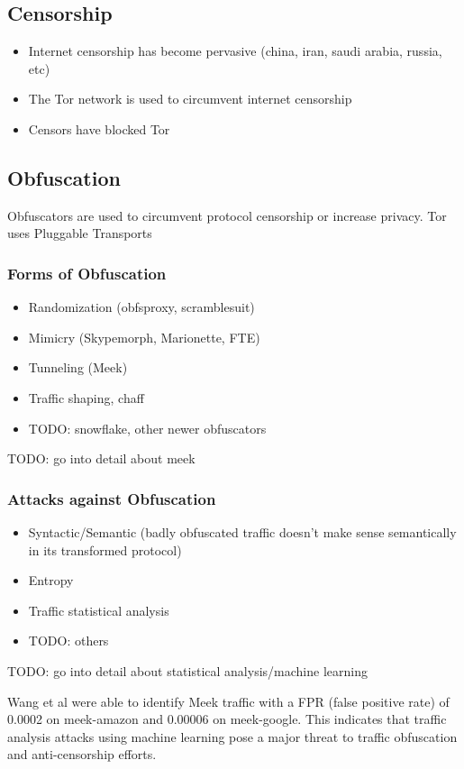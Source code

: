 \subsection{Censorship}
\begin{itemize}
    \item Internet censorship has become pervasive (china, iran, saudi arabia, russia, etc)
    \item The Tor network is used to circumvent internet censorship
    \item Censors have blocked Tor
\end{itemize}
\subsection{Obfuscation}
Obfuscators are used to circumvent protocol censorship or increase privacy. Tor uses Pluggable Transports
\subsubsection{Forms of Obfuscation}

\begin{itemize}
    \item Randomization (obfsproxy, scramblesuit)
    \item Mimicry (Skypemorph, Marionette, FTE)
    \item Tunneling (Meek)
    \item Traffic shaping, chaff
    \item TODO: snowflake, other newer obfuscators
\end{itemize}
TODO: go into detail about meek

\subsubsection{Attacks against Obfuscation}
\begin{itemize}
    \item Syntactic/Semantic (badly obfuscated traffic doesn't make sense semantically in its transformed protocol)
    \item Entropy
    \item Traffic statistical analysis
    \item TODO: others
\end{itemize}

TODO: go into detail about statistical analysis/machine learning

Wang et al \cite{Wang:2015:STN:2810103.2813715} were able to identify Meek traffic with a FPR (false positive rate) of 0.0002 on meek-amazon and 0.00006 on meek-google. This indicates that traffic analysis attacks using machine learning pose a major threat to traffic obfuscation and anti-censorship efforts.

